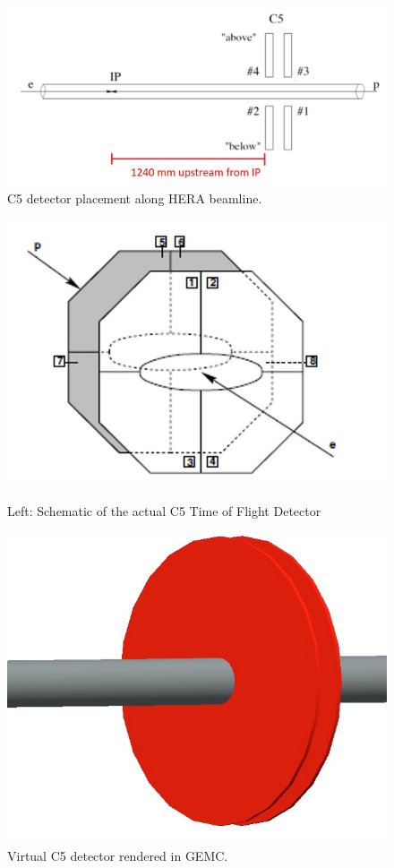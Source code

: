 \begin{figure}
	\centering
	\includegraphics[width=.75\textwidth]{../../img/c5_placement.jpg}
	\caption{C5 detector placement along HERA beamline.}
	\label{fig:hera4}
\end{figure}


\begin{figure}
	\centering
	\begin{minipage}{0.45\textwidth}
		\centering
		\includegraphics[width=.75\textwidth]{../../img/hera_c5.jpg}
		\caption {Left: Schematic of the actual C5 Time of Flight Detector  }
		\label{fig:hera5}
	\end{minipage}\hfill
	\begin{minipage}{0.45\textwidth}
		\centering	\includegraphics[width=.75\textwidth]{../../img/C5_gemc}	
		\caption {Virtual C5 detector rendered in GEMC.}
		\label{fig:hera6}
	\end{minipage}
\end{figure}




